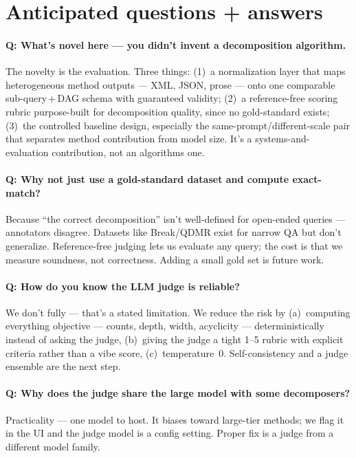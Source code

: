 \documentclass[11pt]{article}
\begin{document}
\section{Anticipated questions + answers}

\paragraph{Q: What's novel here --- you didn't invent a decomposition algorithm.}
The novelty is the evaluation. Three things: (1)~a normalization layer that maps
heterogeneous method outputs --- XML, JSON, prose --- onto one comparable
sub-query\,+\,DAG schema with guaranteed validity; (2)~a reference-free scoring
rubric purpose-built for decomposition quality, since no gold-standard exists;
(3)~the controlled baseline design, especially the same-prompt/different-scale
pair that separates method contribution from model size. It's a
systems-and-evaluation contribution, not an algorithms one.

\paragraph{Q: Why not just use a gold-standard dataset and compute exact-match?}
Because ``the correct decomposition'' isn't well-defined for open-ended queries
--- annotators disagree. Datasets like Break/QDMR exist for narrow QA but don't
generalize. Reference-free judging lets us evaluate any query; the cost is that we
measure soundness, not correctness. Adding a small gold set is future work.

\paragraph{Q: How do you know the LLM judge is reliable?}
We don't fully --- that's a stated limitation. We reduce the risk by (a)~computing
everything objective --- counts, depth, width, acyclicity --- deterministically
instead of asking the judge, (b)~giving the judge a tight 1--5 rubric with
explicit criteria rather than a vibe score, (c)~temperature~0. Self-consistency
and a judge ensemble are the next step.

\paragraph{Q: Why does the judge share the large model with some decomposers?}
Practicality --- one model to host. It biases toward large-tier methods; we flag
it in the UI and the judge model is a config setting. Proper fix is a judge from a
different model family.
\end{document}

